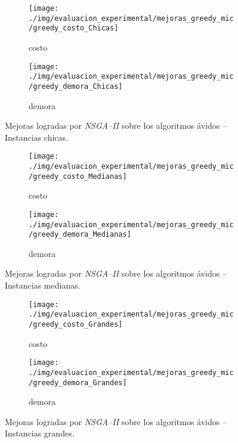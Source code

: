 \begin{figure}[!htpb]
\centering
\begin{subfigure}{.5\textwidth}
  \centering
  \texttt{[image: ./img/evaluacion\_experimental/mejoras\_greedy\_mic/greedy\_costo\_Chicas]}
  \caption{costo}
  \label{fig:mejoras_greedy_costo_mic_chicas}
\end{subfigure}%
\begin{subfigure}{.5\textwidth}
  \centering
  \texttt{[image: ./img/evaluacion\_experimental/mejoras\_greedy\_mic/greedy\_demora\_Chicas]}
  \caption{demora}
  \label{fig:mejoras_greedy_demora_mic_chicas}
\end{subfigure}
\caption{Mejoras logradas por \textit{NSGA--II} sobre los algoritmos ávidos -- Instancias chicas.}
\label{fig:mejora_greedy_mic_chicas}
\end{figure}

\begin{figure}[!htpb]
\centering
\begin{subfigure}{.5\textwidth}
  \centering
  \texttt{[image: ./img/evaluacion\_experimental/mejoras\_greedy\_mic/greedy\_costo\_Medianas]}
  \caption{costo}
  \label{fig:mejoras_greedy_costo_mic_medianas}
\end{subfigure}%
\begin{subfigure}{.5\textwidth}
  \centering
  \texttt{[image: ./img/evaluacion\_experimental/mejoras\_greedy\_mic/greedy\_demora\_Medianas]}
  \caption{demora}
  \label{fig:mejoras_greedy_demora_mic_medianas}
\end{subfigure}
\caption{Mejoras logradas por \textit{NSGA--II} sobre los algoritmos ávidos -- Instancias medianas.}
\label{fig:mejoras_greedy_mic_medianas}
\end{figure}

\begin{figure}[!ht]
\centering
\begin{subfigure}{.5\textwidth}
  \centering
  \texttt{[image: ./img/evaluacion\_experimental/mejoras\_greedy\_mic/greedy\_costo\_Grandes]}
  \caption{costo}
  \label{fig:mejoras_greedy_costo_mic_grandes}
\end{subfigure}%
\begin{subfigure}{.5\textwidth}
  \centering
  \texttt{[image: ./img/evaluacion\_experimental/mejoras\_greedy\_mic/greedy\_demora\_Grandes]}
  \caption{demora}
  \label{fig:mejoras_greedy_demora_mic_grandes}
\end{subfigure}
\caption{Mejoras logradas por \textit{NSGA--II} sobre los algoritmos ávidos -- Instancias grandes.}
\label{fig:mejoras_greedy_mic_grandes}
\end{figure}

